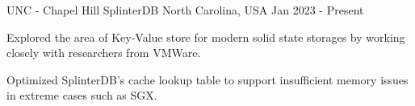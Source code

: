 

\begin{cventries}

  \cventry
    {UNC - Chapel Hill} %
    {SplinterDB} %
    {North Carolina, USA} %
    {Jan 2023 - Present} %
    {
      \begin{cvitems} %
        \item {Explored the area of Key-Value store for modern solid state storages by working closely with researchers from VMWare.}
        \item {Optimized SplinterDB's cache lookup table to support insufficient memory issues in extreme cases such as SGX.}
      \end{cvitems}
    }

    

\end{cventries}
